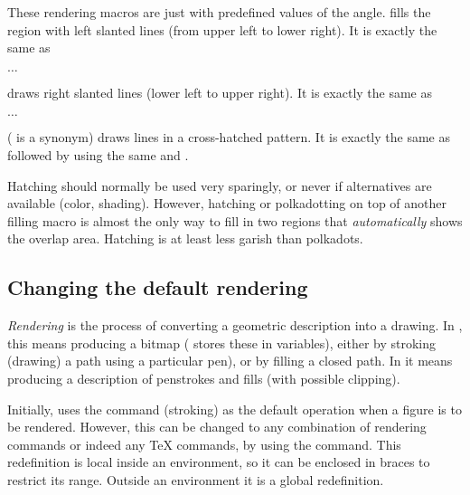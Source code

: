\documentclass[letterpaper]{article}
\begin{document}
These rendering macros are just  with predefined values of
the angle.  fills the region with left slanted lines (from
upper left to lower right). It is exactly the same as
\begin{display}
$\ldots$
\end{display}

 draws right slanted lines (lower left to upper right). It is
exactly the same as
\begin{display}
$\ldots$
\end{display}

 ( is a synonym) draws lines in a cross-hatched
pattern. It is exactly the same as  followed by 
using the same  and .

Hatching should normally be used very sparingly, or never if
alternatives are available (color, shading). However, hatching or
polkadotting on top of another filling macro is almost the only way to
fill in two regions that \emph{automatically} shows the overlap area.
Hatching is at least less garish than polkadots.


\subsection{Changing the default rendering}\label{default}

\emph{Rendering} is the process of converting a geometric description
into a drawing.  In \MF{}, this means producing a bitmap (\MF{} stores
these in  variables), either by stroking (drawing) a path
using a particular pen), or by filling a closed path. In \MP{} it means
producing a \PS{} description of penstrokes and fills (with possible
clipping).

\begin{cd}
%
\end{cd}

Initially, \mfp{} uses the  command (stroking) as the default
operation when a figure is to be rendered.  However, this can be changed
to any combination of \mfp{} rendering commands or indeed any \TeX{}
commands, by using the  command.  This redefinition is
local inside an  environment, so it can be enclosed in braces
to restrict its range. Outside an  environment it is a global
redefinition.
\end{document}
